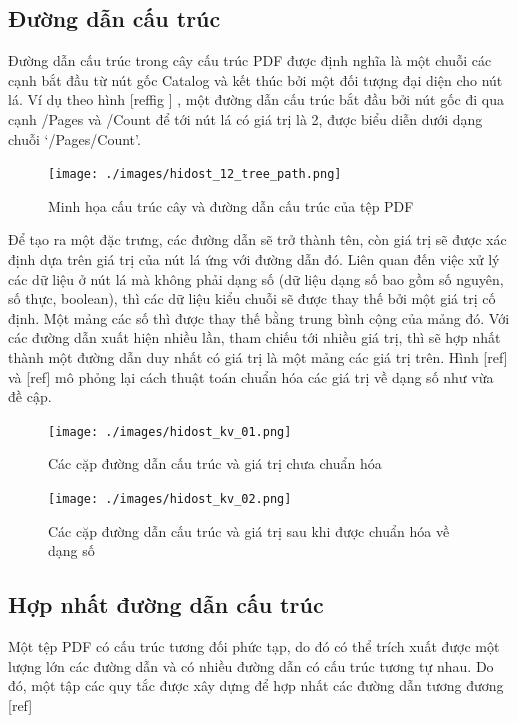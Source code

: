 \documentclass[./../main.tex]{subfiles}
\begin{document}
\subsection*{Đường dẫn cấu trúc}

Đường dẫn cấu trúc trong cây cấu trúc PDF được định nghĩa là một chuỗi các cạnh bắt đầu từ nút gốc Catalog và kết thúc bởi một đối tượng đại diện cho nút lá. Ví dụ theo hình [ref{fig }] , một đường dẫn cấu trúc bắt đầu bởi nút gốc đi qua cạnh /Pages và /Count để tới nút lá có giá trị là 2, được biểu diễn dưới dạng chuỗi ‘\slash Pages\slash Count’.

\begin{figure}[H]
	\centering
	\texttt{[image: ./images/hidost\_12\_tree\_path.png]}
	\caption{Minh họa cấu trúc cây và đường dẫn cấu trúc của tệp PDF}
	\label{fig:hidost_12_tree_path}
\end{figure}

Để tạo ra một đặc trưng, các đường dẫn sẽ trở thành tên, còn giá trị sẽ được xác định dựa trên giá trị của nút lá ứng với đường dẫn đó. Liên quan đến việc xử lý các dữ liệu ở nút lá mà không phải dạng số (dữ liệu dạng số bao gồm số nguyên, số thực, boolean), thì các dữ liệu kiểu chuỗi sẽ được thay thế bởi một giá trị cố định. Một mảng các số thì được thay thế bằng trung bình cộng của mảng đó. Với các đường dẫn xuất hiện nhiều lần, tham chiếu tới nhiều giá trị, thì sẽ hợp nhất thành một đường dẫn duy nhất có giá trị là một mảng các giá trị trên. Hình [ref] và [ref] mô phỏng lại cách thuật toán chuẩn hóa các giá trị về dạng số như vừa đề cập.

\begin{figure}[H]
	\centering
	\texttt{[image: ./images/hidost\_kv\_01.png]}
	\caption{Các cặp đường dẫn cấu trúc và giá trị chưa chuẩn hóa}
	\label{fig:hidost_kv_01}
\end{figure}

\begin{figure}[H]
	\centering
	\texttt{[image: ./images/hidost\_kv\_02.png]}
	\caption{Các cặp đường dẫn cấu trúc và giá trị sau khi được chuẩn hóa về dạng số}
	\label{fig:hidost_kv_02}
\end{figure}

\subsection*{Hợp nhất đường dẫn cấu trúc}
Một tệp PDF có cấu trúc tương đối phức tạp, do đó có thể trích xuất được một lượng lớn các đường dẫn và có nhiều đường dẫn có cấu trúc tương tự nhau. Do đó, một tập các quy tắc được xây dựng để hợp nhất các đường dẫn tương đương [ref]
\end{document}
